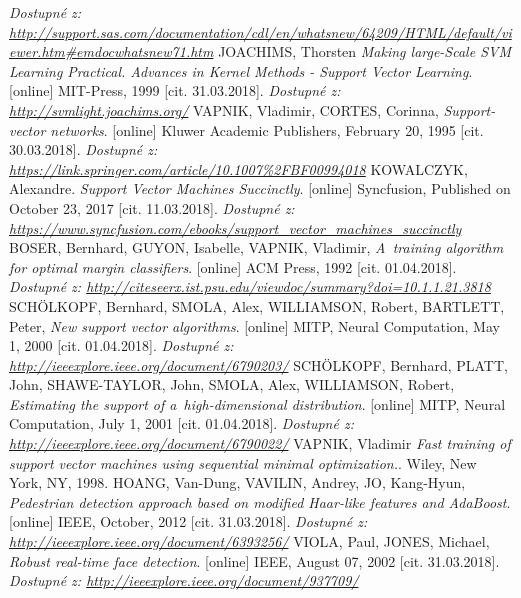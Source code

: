 \begin{thebibliography}{99}
			\textit{Dostupné z: \url{http://support.sas.com/documentation/cdl/en/whatsnew/64209/HTML/default/viewer.htm\#emdocwhatsnew71.htm}}
 	 JOACHIMS, Thorsten \textit{Making large-Scale SVM Learning Practical. Advances in Kernel Methods - Support Vector Learning}. [online] MIT-Press, 1999 [cit. 31.03.2018]. 
 		\textit{Dostupné z: \url{http://svmlight.joachims.org/}}
	 VAPNIK, Vladimir, CORTES, Corinna, \textit{Support-vector networks}. [online] Kluwer Academic Publishers, February 20, 1995 [cit. 30.03.2018]. 
 		\textit{Dostupné z: \url{https://link.springer.com/article/10.1007\%2FBF00994018}}
	 KOWALCZYK, Alexandre.  \textit{Support Vector Machines Succinctly}.  [online] Syncfusion, Published on October 23, 2017 [cit. 11.03.2018]. 
		\textit{Dostupné z: \url{https://www.syncfusion.com/ebooks/support_vector_machines_succinctly}}
	 BOSER, Bernhard, GUYON, Isabelle, VAPNIK, Vladimir, \textit{A~training algorithm for optimal margin classifiers}. [online] ACM Press, 1992 [cit. 01.04.2018]. 
 		\textit{Dostupné z: \url{http://citeseerx.ist.psu.edu/viewdoc/summary?doi=10.1.1.21.3818}}
 	 SCHÖLKOPF, Bernhard, SMOLA, Alex, WILLIAMSON, Robert, BARTLETT, Peter, \textit{New support vector algorithms}. [online] MITP, Neural Computation, May 1, 2000 [cit. 01.04.2018]. 
 		\textit{Dostupné z: \url{http://ieeexplore.ieee.org/document/6790203/}}
 	 SCHÖLKOPF, Bernhard, PLATT, John, SHAWE-TAYLOR, John, SMOLA, Alex, WILLIAMSON, Robert, \textit{Estimating the support of a~high-dimensional distribution}. [online] MITP, Neural Computation, July 1, 2001 [cit. 01.04.2018]. 
 		\textit{Dostupné z: \url{http://ieeexplore.ieee.org/document/6790022/}}
 	 VAPNIK, Vladimir \textit{Fast training of support vector machines using sequential minimal optimization.}. Wiley, New York, NY, 1998. 
 	 HOANG, Van-Dung, VAVILIN, Andrey, JO, Kang-Hyun, \textit{Pedestrian detection approach based on modified Haar-like features and AdaBoost}. [online] IEEE, October, 2012 [cit. 31.03.2018]. 
 		\textit{Dostupné z: \url{http://ieeexplore.ieee.org/document/6393256/}}
 	 VIOLA, Paul, JONES, Michael, \textit{Robust real-time face detection}. [online] IEEE, August 07, 2002 [cit. 31.03.2018]. 
 		\textit{Dostupné z: \url{http://ieeexplore.ieee.org/document/937709/}}

\end{thebibliography}
